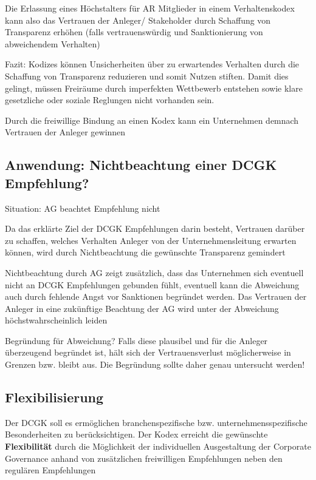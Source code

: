 \documentclass[
]{article}
\begin{document}
Die Erlassung eines Höchstalters für AR Mitglieder in einem
Verhaltenskodex kann also das Vertrauen der Anleger/ Stakeholder durch
Schaffung von Transparenz erhöhen (falls vertrauenswürdig und
Sanktionierung von abweichendem Verhalten)

Fazit: Kodizes können Unsicherheiten über zu erwartendes Verhalten durch
die Schaffung von Transparenz reduzieren und somit Nutzen stiften. Damit
dies gelingt, müssen Freiräume durch imperfekten Wettbewerb entstehen
sowie klare gesetzliche oder soziale Reglungen nicht vorhanden sein.

Durch die freiwillige Bindung an einen Kodex kann ein Unternehmen
demnach Vertrauen der Anleger gewinnen

\hypertarget{anwendung-nichtbeachtung-einer-dcgk-empfehlung}{%
\subsection{Anwendung: Nichtbeachtung einer DCGK
Empfehlung?}\label{anwendung-nichtbeachtung-einer-dcgk-empfehlung}}

Situation: AG beachtet Empfehlung nicht

Da das erklärte Ziel der DCGK Empfehlungen darin besteht, Vertrauen
darüber zu schaffen, welches Verhalten Anleger von der
Unternehmensleitung erwarten können, wird durch Nichtbeachtung die
gewünschte Transparenz gemindert

Nichtbeachtung durch AG zeigt zusätzlich, dass das Unternehmen sich
eventuell nicht an DCGK Empfehlungen gebunden fühlt, eventuell kann die
Abweichung auch durch fehlende Angst vor Sanktionen begründet werden.
Das Vertrauen der Anleger in eine zukünftige Beachtung der AG wird unter
der Abweichung höchstwahrscheinlich leiden

Begründung für Abweichung? Falls diese plausibel und für die Anleger
überzeugend begründet ist, hält sich der Vertrauensverlust
möglicherweise in Grenzen bzw. bleibt aus. Die Begründung sollte daher
genau untersucht werden!

\hypertarget{flexibilisierung}{%
\subsection{Flexibilisierung}\label{flexibilisierung}}

Der DCGK soll es ermöglichen branchenspezifische bzw.
unternehmensspezifische Besonderheiten zu berücksichtigen. Der Kodex
erreicht die gewünschte \textbf{Flexibilität} durch die Möglichkeit der
individuellen Ausgestaltung der Corporate Governance anhand von
zusätzlichen freiwilligen Empfehlungen neben den regulären Empfehlungen
\end{document}
